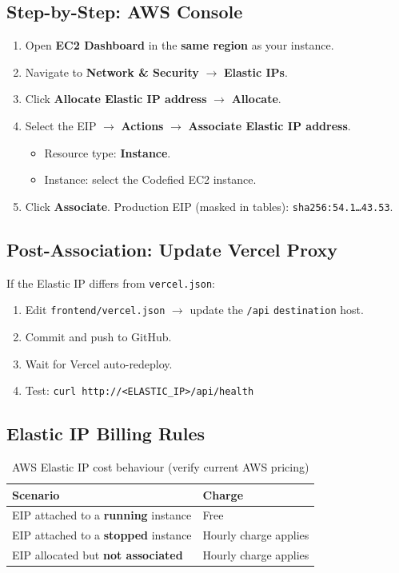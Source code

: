 \documentclass[11pt,a4paper]{article}
\newcommand{\maskedectwoip}{\texttt{sha256:54.1\ldots 43.53}}
\begin{document}
\subsection{Step-by-Step: AWS Console}
\begin{enumerate}
  \item Open \textbf{EC2 Dashboard} in the \textbf{same region} as your instance.
  \item Navigate to \textbf{Network \& Security} $\rightarrow$ \textbf{Elastic IPs}.
  \item Click \textbf{Allocate Elastic IP address} $\rightarrow$ \textbf{Allocate}.
  \item Select the EIP $\rightarrow$ \textbf{Actions} $\rightarrow$ \textbf{Associate Elastic IP address}.
  \begin{itemize}[noitemsep]
    \item Resource type: \textbf{Instance}.
    \item Instance: select the Codefied EC2 instance.
  \end{itemize}
  \item Click \textbf{Associate}. Production EIP (masked in tables): \maskedectwoip.
\end{enumerate}

\subsection{Post-Association: Update Vercel Proxy}
If the Elastic IP differs from \texttt{vercel.json}:
\begin{enumerate}[noitemsep]
  \item Edit \texttt{frontend/vercel.json} $\rightarrow$ update the \texttt{/api} \texttt{destination} host.
  \item Commit and push to GitHub.
  \item Wait for Vercel auto-redeploy.
  \item Test: \texttt{curl http://<ELASTIC\_IP>/api/health}
\end{enumerate}

\subsection{Elastic IP Billing Rules}
\begin{table}[h]
\centering
\begin{tabular}{@{}ll@{}}
\toprule
\textbf{Scenario} & \textbf{Charge} \\
\midrule
EIP attached to a \textbf{running} instance & Free \\
EIP attached to a \textbf{stopped} instance & Hourly charge applies \\
EIP allocated but \textbf{not associated} & Hourly charge applies \\
\bottomrule
\end{tabular}
\caption{AWS Elastic IP cost behaviour (verify current AWS pricing)}
\end{table}
\end{document}
